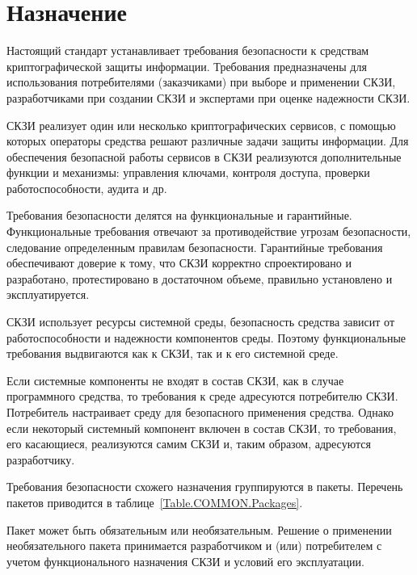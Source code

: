 \section{Назначение}\label{COMMON.Purpose}

Настоящий стандарт устанавливает требования безопасности к средствам
криптографической защиты информации. Требования предназначены для использования
потребителями (заказчиками) при выборе и применении СКЗИ,
разработчиками при создании СКЗИ и
экспертами при оценке надежности СКЗИ.

СКЗИ реализует один или несколько криптографических сервисов, с помощью 
которых операторы средства решают различные задачи защиты информации.
%
Для обеспечения безопасной работы сервисов в СКЗИ реализуются 
дополнительные функции и механизмы: управления ключами,
контроля доступа, проверки работоспособности, аудита и др.

Требования безопасности делятся на функциональные и гарантийные.
%
Функциональные требования отвечают за противодействие угрозам безопасности, 
следование определенным правилам безопасности.
%
Гарантийные требования обеспечивают доверие к тому, что СКЗИ корректно
спроектировано и разработано, протестировано в достаточном объеме, правильно
установлено и эксплуатируется.

СКЗИ использует ресурсы системной среды, безопасность средства зависит от 
работоспособности и надежности компонентов среды. 
%
Поэтому функциональные требования выдвигаются как к СКЗИ, 
так и к его системной среде. 

Если системные компоненты не входят в состав СКЗИ, как в случае программного 
средства, то требования к среде адресуются потребителю СКЗИ. 
Потребитель настраивает среду для безопасного применения средства. 
%
Однако если некоторый системный компонент включен в состав СКЗИ, то требования, 
его касающиеся, реализуются самим СКЗИ и, таким образом, адресуются 
разработчику.

Требования безопасности схожего назначения группируются в пакеты. 
Перечень пакетов приводится в таблице~\ref{Table.COMMON.Packages}.

Пакет может быть обязательным или необязательным. Решение о применении 
необязательного пакета принимается разработчиком и (или) потребителем 
с учетом функционального назначения СКЗИ и условий его эксплуатации.

